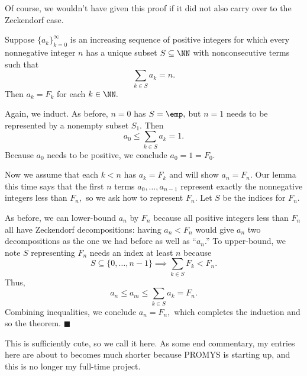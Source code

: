 Of course, we wouldn't have given this proof if it did not also carry over to the Zeckendorf case.
\begin{theorem}
    Suppose $\{a_k\}_{k=0}^\infty$ is an increasing sequence of positive integers for which every nonnegative integer $n$ has a unique subset $S\subseteq\NN$ with nonconsecutive terms such that
    \[\sum_{k\in S}a_k=n.\]
    Then $a_k=F_k$ for each $k\in\NN.$
\end{theorem}
Again, we induct. As before, $n=0$ has $S=\emp,$ but $n=1$ needs to be represented by a nonempty subset $S_1.$ Then
\[a_0\le\sum_{k\in S}a_k=1.\]
Because $a_0$ needs to be positive, we conclude $a_0=1=F_0.$

Now we assume that each $k<n$ has $a_k=F_k$ and will show $a_n=F_n.$ Our lemma this time says that the first $n$ terms $a_0,\ldots,a_{n-1}$ represent exactly the nonnegative integers less than $F_n,$ so we ask how to represent $F_n.$ Let $S$ be the indices for $F_n.$

As before, we can lower-bound $a_n$ by $F_n$ because all positive integers less than $F_n$ all have Zeckendorf decompositions: having $a_n<F_n$ would give $a_n$ two decompositions as the one we had before as well as ``$a_n$.'' To upper-bound, we note $S$ representing $F_n$ needs an index at least $n$ because
\[S\subseteq\{0,\ldots,n-1\}\implies\sum_{k\in S}F_k<F_n.\]
Thus,
\[a_n\le a_m\le\sum_{k\in S}a_k=F_n.\]
Combining inequalities, we conclude $a_n=F_n,$ which completes the induction and so the theorem. $\blacksquare$

This is sufficiently cute, so we call it here. As some end commentary, my entries here are about to becomes much shorter because PROMYS is starting up, and this is no longer my full-time project.

